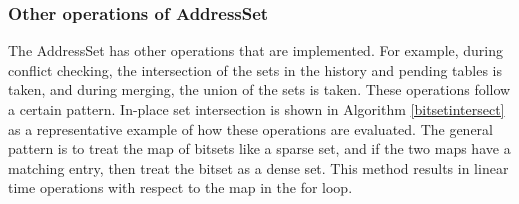 \documentclass[12pt,twoside]{reedthesis}
\begin{document}
			\subsubsection{Other operations of AddressSet}
			
			The AddressSet has other operations that are implemented. For example, during conflict checking, the intersection of the sets in the history and pending tables is taken, and during merging, the union of the sets is taken. 
			These operations follow a certain pattern. In-place set intersection is shown in Algorithm \ref{bitsetintersect} as a representative example of how these operations are evaluated. 
			The general pattern is to treat the map of bitsets like a sparse set, and if the two maps have a matching entry, then treat the bitset as a dense set. This method results in linear time operations with respect to the map in the for loop. 
			
			
			
			
			
\end{document}
